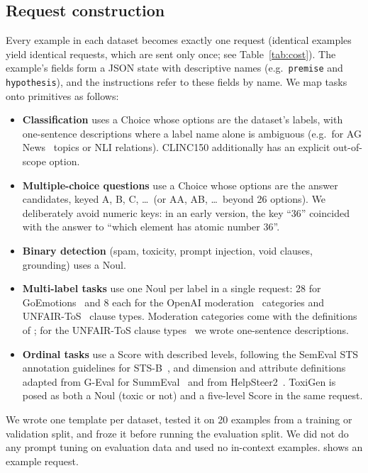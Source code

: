 \documentclass[table]{article}
\begin{document}
\begin{table}[t]
\centering
\caption{Benchmark suite: 37 datasets in seven categories, the split we evaluate, the number of evaluated examples $n$, the number of languages for multilingual datasets, and the Jev primitive used (number of options or levels in parentheses; $\times k$: $k$ questions per request).}
\label{tab:suite}
\footnotesize
\setlength{\tabcolsep}{4pt}

\end{table}

\subsection{Request construction}

Every example in each dataset becomes exactly one request (identical examples yield identical requests, which are sent only once; see Table~\ref{tab:cost}). The example's fields form a JSON state with descriptive names (e.g.\ \texttt{premise} and \texttt{hypothesis}), and the instructions refer to these fields by name. We map tasks onto primitives as follows:
\begin{itemize}[leftmargin=*,noitemsep]
    \item \textbf{Classification} uses a Choice whose options are the dataset's labels, with one-sentence descriptions where a label name alone is ambiguous (e.g.\ for AG News~\cite{zhang2015character} topics or NLI relations). CLINC150 additionally has an explicit out-of-scope option.
    \item \textbf{Multiple-choice questions} use a Choice whose options are the answer candidates, keyed A, B, C, \ldots\ (or AA, AB, \ldots\ beyond 26 options). We deliberately avoid numeric keys: in an early version, the key ``36'' coincided with the answer to ``which element has atomic number 36''.
    \item \textbf{Binary detection} (spam, toxicity, prompt injection, void clauses, grounding) uses a Noul.
    \item \textbf{Multi-label tasks} use one Noul per label in a single request: 28 for GoEmotions~\cite{demszky-etal-2020-goemotions} and 8 each for the OpenAI moderation~\cite{markov2023holistic} categories and UNFAIR-ToS~\cite{chalkidis-etal-2021-lexglue} clause types. Moderation categories come with the definitions of \cite{markov2023holistic}; for the UNFAIR-ToS clause types~\cite{chalkidis-etal-2021-lexglue} we wrote one-sentence descriptions.
    \item \textbf{Ordinal tasks} use a Score with described levels, following the SemEval STS annotation guidelines for STS-B~\cite{cer-etal-2017-semeval}, and dimension and attribute definitions adapted from G-Eval for SummEval~\cite{liu-etal-2023-g} and from HelpSteer2~\cite{wang2024helpsteer2}. ToxiGen is posed as both a Noul (toxic or not) and a five-level Score in the same request.
\end{itemize}
We wrote one template per dataset, tested it on 20 examples from a training or validation split, and froze it before running the evaluation split. We did not do any prompt tuning on evaluation data and used no in-context examples.  shows an example request.
\end{document}
